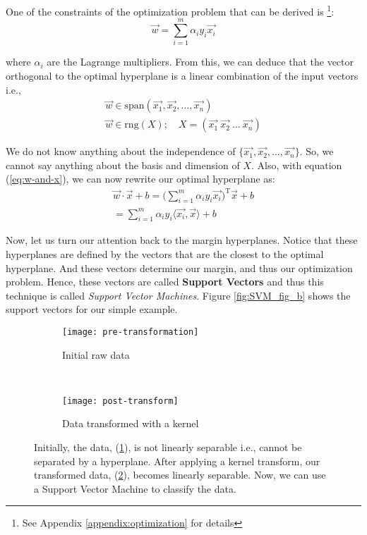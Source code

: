 One of the constraints of the optimization problem that can be derived is \footnote{See Appendix \ref{appendix:optimization} for details}:
\begin{equation}
\vec{w} = \sum_{i = 1}^{m}\alpha_{i}y_{i}\vec{x_i} \label{eq:w-and-x}
\end{equation}

where $\alpha_{i}$ are the Lagrange multipliers. From this, we can deduce that the vector orthogonal to the optimal hyperplane is a linear combination of the input vectors i.e.,
\begin{gather}
	\vec{w} \in \text{span}(\vec{x_1}, \vec{x_2}, \dots, \vec{x_n}) \label{eq:normal-inputs} \\
	\vec{w} \in \text{rng}(X); \quad X = (\vec{x_1} \ \vec{x_2} \ \dots \ \vec{x_n})
\end{gather}

We do not know anything about the independence of $\{\vec{x_1}, \vec{x_2}, \dots, \vec{x_n}\}$. So, we cannot say anything about the basis and dimension of $X$. Also, with equation (\ref{eq:w-and-x}), we can now rewrite our optimal hyperplane as:
\begin{align}
	\vec{w}\cdot\vec{x} + b = \Big(\sum_{i = 1}^{m}\alpha_{i}y_{i}\vec{x_i}\Big)^{\text{T}}\vec{x} + b \nonumber \\
= \sum_{i = 1}^{m}\alpha_{i}y_{i}\langle\vec{x_i}, \vec{x}\rangle + b \label{eq:new-plane}
\end{align}

Now, let us turn our attention back to the margin hyperplanes. Notice that these hyperplanes are defined by the vectors that are the closest to the optimal hyperplane. And these vectors determine our margin, and thus our optimization problem. Hence, these vectors are called \textbf{Support Vectors} and thus this technique is called \textit{Support Vector Machines}. Figure \ref{fig:SVM_fig_b} shows the support vectors for our simple example.

\begin{figure*}[!tb]
	\centering
	\begin{subfigure}[t]{0.5\textwidth}
		\texttt{[image: pre-transformation]}
		\caption{Initial raw data}
		\centering
		\label{fig:pre-trans}
	\end{subfigure}%
	~
	\begin{subfigure}[t]{0.5\textwidth}
		\texttt{[image: post-transform]}
		\caption{Data transformed with a kernel}
		\centering
		\label{fig:post-trans}
	\end{subfigure}%
	
	\caption{Initially, the data, (\ref{fig:pre-trans}), is not linearly separable i.e., cannot be separated by a hyperplane. After applying a kernel transform, our transformed data, (\ref{fig:post-trans}), becomes linearly separable. Now, we can use a Support Vector Machine to classify the data.}	
	\label{fig:kernel}
\end{figure*}

